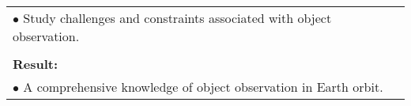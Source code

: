 \begin{table}[!h]
\begin{center}
\begin{tabular}{|p{35mm}||p{55mm}|p{50mm}||p{40mm}|}
      \multicolumn{4}{|p{150mm}|}{$\bullet$ Study challenges and constraints associated with object observation.} \\
      \multicolumn{4}{|p{150mm}|}{}                                                                                                                                                                           \\
      \multicolumn{4}{|p{150mm}|}{\textbf{Result:}}                                                                                                                                                       \\
      \multicolumn{4}{|p{150mm}|}{$\bullet$ A comprehensive knowledge of object observation in Earth orbit.}                                                                                                                          \\
      \hline
    \end{tabular}
  \end{center}
\end{table}

\clearpage


